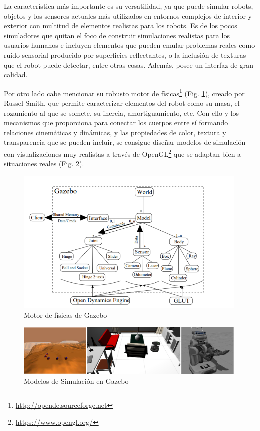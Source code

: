 La característica más importante es su versatilidad, ya que puede simular robots, objetos y los sensores actuales más utilizados en entornos complejos de
interior y exterior con multitud de elementos realistas para los robots. Es de los pocos simuladores que quitan el foco de construir simulaciones realistas para los usuarios humanos e incluyen elementos que pueden emular problemas reales como ruido sensorial producido por superficies reflectantes, o la inclusión de texturas que el robot puede detectar, entre otras cosas. Además, posee un interfaz de gran calidad.

Por otro lado cabe mencionar su robusto motor de físicas\footnote{\url{http://opende.sourceforge.net}} (Fig. \ref{gazebo-physics}), creado por Russel Smith, que permite caracterizar elementos del robot como su masa, el rozamiento al que se somete, su inercia, amortiguamiento, etc. Con ello y los mecanismos que proporciona para conectar los cuerpos entre sí formando relaciones cinemáticas y dinámicas, y las propiedades de color, textura y transparencia que se pueden incluir, se consigue diseñar modelos de simulación con visualizaciones muy realistas a través de OpenGL\footnote{\url{https://www.opengl.org/}} que se adaptan bien a situaciones reales (Fig. \ref{gazebo-models}).

\begin{figure}[!hbtp]  \centering\noindent
    \includegraphics[width=0.99\textwidth]{figures/gazebo-engine.png}
    \caption{Motor de físicas de Gazebo}
    \label{gazebo-physics}
\end{figure}

\begin{figure}[!hbtp]  \centering\noindent
    \includegraphics[width=0.99\textwidth]{figures/gazebo-models.png}
    \caption{Modelos de Simulación en Gazebo}
    \label{gazebo-models}
\end{figure}
 
